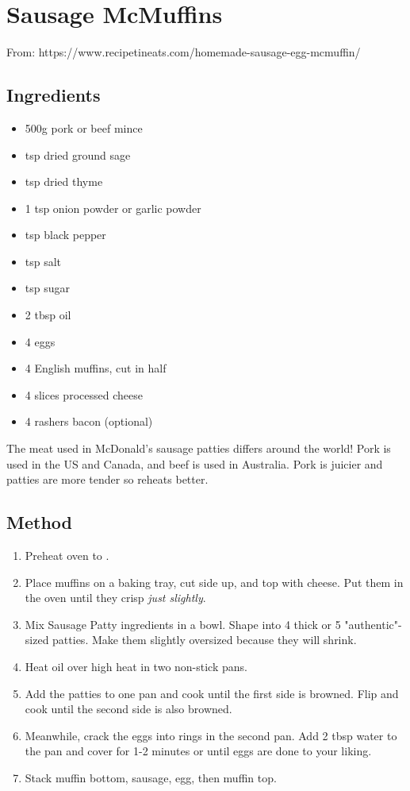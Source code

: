 \clearpage
\section{Sausage McMuffins}


From: https://www.recipetineats.com/homemade-sausage-egg-mcmuffin/

\subsection{Ingredients}

\begin{itemize}
	\item 500g pork or beef mince
	\item {} tsp dried ground sage
	\item {} tsp dried thyme
	\item 1 tsp onion powder or garlic powder
	\item {} tsp black pepper
	\item {} tsp salt
	\item {} tsp sugar
	\item 2 tbsp oil
	\item 4 eggs
	\item 4 English muffins, cut in half
	\item 4 slices processed cheese
	\item 4 rashers bacon (optional)
\end{itemize}

The meat used in McDonald's sausage patties differs around the world! Pork is used in the US and Canada, and beef is used in Australia. Pork is juicier and patties are more tender so reheats better.

\subsection{Method}

\begin{enumerate}
	\item Preheat oven to .
	\item Place muffins on a baking tray, cut side up, and top with cheese. Put them in the oven until they crisp \emph{just slightly}.
	\item Mix Sausage Patty ingredients in a bowl. Shape into 4 thick or 5 "authentic"-sized patties. Make them slightly oversized because they will shrink.
	\item Heat oil over high heat in two non-stick pans.
	\item Add the patties to one pan and cook until the first side is browned. Flip and cook until the second side is also browned.
	\item Meanwhile, crack the eggs into rings in the second pan. Add 2 tbsp water to the pan and cover for 1-2 minutes or until eggs are done to your liking.
	\item Stack muffin bottom, sausage, egg, then muffin top.
\end{enumerate}
